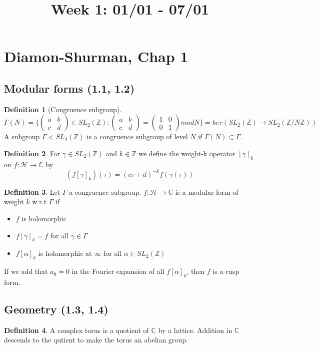 \documentclass[11pt]{article}
\title{Week 1: 01/01 - 07/01}
\date{}
\theoremstyle{definition}
\newtheorem{definition}{Definition}[section]
\theoremstyle{example}
\theoremstyle{remark}
\theoremstyle{lemma}
\theoremstyle{proposition}
\theoremstyle{Problem}
\theoremstyle{Solution}
\theoremstyle{theorem}
\begin{document}
\maketitle
\section{Diamon-Shurman, Chap 1}
\subsection{Modular forms (1.1, 1.2)}
\begin{definition}[Congruence subgroup]
$$ \Gamma(N) = \{ 
\begin{pmatrix}
a & b \\
c & d
\end{pmatrix}
 \in SL_2(\mathbb{Z}) :
\begin{pmatrix}
a & b \\
c & d
\end{pmatrix}
= 
\begin{pmatrix}
1 & 0 \\
0 & 1
\end{pmatrix}
mod N \} = ker(SL_2(\mathbb{Z}) \to SL_2(\mathbb{Z}/N\mathbb{Z}))$$
A subgroup $\Gamma < SL_2(\mathbb{Z})$ is a congruence subgroup of level $N$ if $\Gamma(N) \subset \Gamma$.
\end{definition}

\begin{definition}
For $\gamma \in SL_2(\mathbb{Z})$ and $k\in \mathbb{Z}$ we define the weight-k operator $[\gamma]_k$ on $f: \mathcal{H} \to \mathbb{C}$ by 
$$ (f[\gamma]_k) ( \tau) = (c\tau + d)^{-k} f(\gamma(\tau))$$
\end{definition}

\begin{definition}
Let $\Gamma$ a congruence subgroup. $f: \mathcal{H} \to \mathbb{C}$ is a modular form of weight $k$ w.r.t $\Gamma$ if 
\begin{itemize}
\item $f$ is holomorphic
\item $f[\gamma]_k = f$ for all $\gamma \in \Gamma$
\item $f[\alpha]_k$ is holomorphic at $\infty$ for all $\alpha \in SL_2(\mathbb{Z})$
\end{itemize}
If we add that $a_0 = 0$ in the Fourier expansion of all $f[\alpha]_k$, then $f$ is a cusp form.
\end{definition}

\subsection{Geometry (1.3, 1.4)}
\begin{definition}
A complex torus is a quotient of $\mathbb{C}$ by a lattice. Addition in $\mathbb{C}$ descends to the qutient to make the torus an abelian group.
\end{definition}
\end{document}
